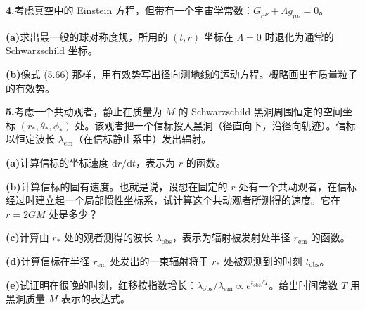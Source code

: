 \textbf{4.}\quad 考虑真空中的 Einstein 方程，但带有一个宇宙学常数：$G_{\mu\nu} + \Lambda g_{\mu\nu} = 0$。

\textbf{(a)}\quad 求出最一般的球对称度规，所用的 $(t, r)$ 坐标在 $\Lambda = 0$ 时退化为通常的 Schwarzschild 坐标。

\textbf{(b)}\quad 像式 (5.66) 那样，用有效势写出径向测地线的运动方程。概略画出有质量粒子的有效势。

\textbf{5.}\quad 考虑一个共动观者，静止在质量为 $M$ 的 Schwarzschild 黑洞周围恒定的空间坐标 $(r_*, \theta_*, \phi_*)$ 处。该观者把一个信标投入黑洞（径直向下，沿径向轨迹）。信标以恒定波长 $\lambda_{\mathrm{em}}$（在信标静止系中）发出辐射。

\textbf{(a)}\quad 计算信标的坐标速度 $\mathrm{d}r/\mathrm{d}t$，表示为 $r$ 的函数。

\textbf{(b)}\quad 计算信标的固有速度。也就是说，设想在固定的 $r$ 处有一个共动观者，在信标经过时建立起一个局部惯性坐标系，试计算这个共动观者所测得的速度。它在 $r = 2GM$ 处是多少？

\textbf{(c)}\quad 计算由 $r_*$ 处的观者测得的波长 $\lambda_{\mathrm{obs}}$，表示为辐射被发射处半径 $r_{\mathrm{em}}$ 的函数。

\textbf{(d)}\quad 计算信标在半径 $r_{\mathrm{em}}$ 处发出的一束辐射将于 $r_*$ 处被观测到的时刻 $t_{\mathrm{obs}}$。

\textbf{(e)}\quad 试证明在很晚的时刻，红移按指数增长：$\lambda_{\mathrm{obs}}/\lambda_{\mathrm{em}} \propto e^{t_{\mathrm{obs}}/T}$。给出时间常数 $T$ 用黑洞质量 $M$ 表示的表达式。


